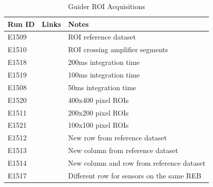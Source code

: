 \begin{table}[ht]\label{table:runs_guider}
\centering
\caption{Guider ROI Acquisitions}
\begin{tabular}{|p{1.5cm}|p{2.9cm}|p{9cm}|}
\hline
Run ID & Links & Notes \\ \hline
E1509 & & ROI reference dataset\\ \hline
E1510 & & ROI crossing amplifier segments\\ \hline
E1518 & & 200ms integration time\\ \hline
E1519 & & 100ms integration time\\ \hline
E1508 & & 50ms integration time\\ \hline
E1520 & & 400x400 pixel ROIs\\ \hline
E1511 & & 200x200 pixel ROIs\\ \hline
E1521 & & 100x100 pixel ROIs\\ \hline
E1512 & & New row from reference dataset\\ \hline
E1513 & & New column from reference dataset\\ \hline
E1514 & & New column and row from reference dataset\\ \hline
E1517 & & Different row for sensors on the same REB\\ \hline
\end{tabular}
\end{table}


